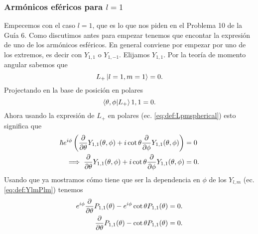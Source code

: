 \documentclass[10pt, a4paper]{article}
\newcommand{\Ylm}{Y_{l,m}}
\newcommand{\Ylmev}[2]{Y_{#1,#2}}
\newcommand{\Plmev}[2]{P_{#1,#2}}
\numberwithin{equation}{subsection}
\begin{document}
\subsubsection{Armónicos eféricos para $l = 1$}

Empecemos con el caso $l = 1$, que es lo que nos piden en el Problema 10 de la
Guía 6. Como discutimos antes para empezar tenemos que encontar la expresión de
uno de los armónicos esféricos. En general conviene por empezar por uno de los
extremos, es decir con $\Ylmev{1}{1}$ o $\Ylmev{1}{-1}$. Elijamos
$\Ylmev{1}{1}$. Por la teoría de momento angular sabemos que
\begin{equation}
  L_+\ket{l = {1}, m = {1}} = 0.
\end{equation}
Projectando en la base de posición en polares
\begin{equation}
  \braket{\theta,\phi}{L_+}{1,1} = 0.
\end{equation}
Ahora usando la expresión de $L_+$ en polares (ec. \eqref{eq:def:Lpmspherical})
esto significa que
\begin{align}
  \hbar e^{i\phi}\left(\pdv{\theta}\Ylmev{1}{1}(\theta,\phi) +
    i\cot\theta\pdv{\phi}\Ylmev{1}{1}(\theta,\phi)\right) &= 0 \\
    \implies 
  \pdv{\theta}\Ylmev{1}{1}(\theta,\phi) +
    i\cot\theta\pdv{\phi}\Ylmev{1}{1}(\theta,\phi) &= 0.
\end{align}
Usando que ya mostramos cómo tiene que ser la dependencia en $\phi$ de los
$\Ylm$ (ec. \eqref{eq:def:YlmPlm}) tenemos
\begin{align}
  e^{i\phi}\pdv{\theta}\Plmev{1}{1}(\theta)
    -e^{i\phi}\cot\theta\Plmev{1}{1}(\theta) &= 0. \\
  \pdv{\theta}\Plmev{1}{1}(\theta)
    -\cot\theta\Plmev{1}{1}(\theta) &= 0.
\end{align}
\end{document}
